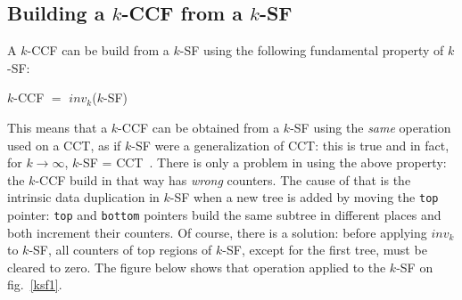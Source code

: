 \documentclass[a4paper,10pt]{report}
\begin{document}
\subsection{Building a $k$-CCF from a $k$-SF}

A $k$-CCF can be build from a $k$-SF using the following fundamental property of $k$-SF:
\begin{center}
$k$-CCF $=$ $inv_k$($k$-SF)
\end{center}
This means that a $k$-CCF can be obtained from a $k$-SF using the \emph{same} operation
used on a CCT, as if $k$-SF were a generalization of CCT: this is true and in fact, for $k\rightarrow \infty$, $k$-SF = CCT~\cite{kccf}.
There is only a problem in using the above property: the $k$-CCF build in that way has \emph{wrong} counters. The cause of that is the intrinsic data duplication in $k$-SF when a new tree is added by moving the \verb|top| pointer: \verb|top| and \verb|bottom| pointers build the same subtree in different places and both increment their counters. Of course, there is a solution: before applying $inv_k$ to $k$-SF, all counters of top regions of $k$-SF, except for the first tree, must be cleared to zero. The figure below shows that operation applied to the $k$-SF on fig.~\ref{ksf1}.
\end{document}
